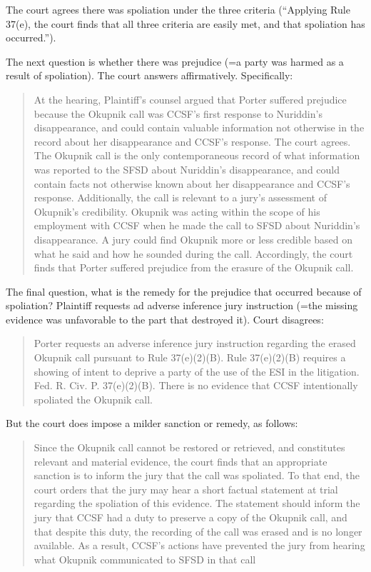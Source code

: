 \documentclass[
  10pt,
  dvipsnames,enabledeprecatedfontcommands]{scrartcl}
\begin{document}
The court agrees there was spoliation under the three criteria
(``Applying Rule 37(e), the court finds that all three criteria are
easily met, and that spoliation has occurred.'').

The next question is whether there was prejudice (=a party was harmed as
a result of spoliation). The court answers affirmatively. Specifically:

\begin{quote}
At the hearing, Plaintiff’s counsel argued that Porter suffered prejudice because the
Okupnik call was CCSF’s first response to Nuriddin’s disappearance, and could contain valuable
information not otherwise in the record about her disappearance and CCSF’s response. The court
agrees. The Okupnik call is the only contemporaneous record of what information was reported to
the SFSD about Nuriddin’s disappearance, and could contain facts not otherwise known about her
disappearance and CCSF’s response. Additionally, the call is relevant to a jury’s assessment of
Okupnik’s credibility. Okupnik was acting within the scope of his employment with CCSF when
he made the call to SFSD about Nuriddin’s disappearance. A jury could find Okupnik more or
less credible based on what he said and how he sounded during the call. Accordingly, the court
finds that Porter suffered prejudice from the erasure of the Okupnik call.
\end{quote}

The final question, what is the remedy for the prejudice that occurred
because of spoliation? Plaintiff requests ad adverse inference jury
instruction (=the missing evidence was unfavorable to the part that
destroyed it). Court disagrees:

\begin{quote}
Porter requests an adverse inference jury instruction regarding the erased Okupnik call
pursuant to Rule 37(e)(2)(B). Rule 37(e)(2)(B) requires a showing of intent to deprive a party of
the use of the ESI in the litigation. Fed. R. Civ. P. 37(e)(2)(B). There is no evidence that CCSF
intentionally spoliated the Okupnik call.
\end{quote}

But the court does impose a milder sanction or remedy, as follows:

\begin{quote}
Since the Okupnik call cannot be restored or retrieved, and constitutes
relevant and material evidence, the court finds that an appropriate sanction is to inform the jury
that the call was spoliated. To that end, the court orders that the jury may hear a short factual
statement at trial regarding the spoliation of this evidence. The statement should inform the jury
that CCSF had a duty to preserve a copy of the Okupnik call, and that despite this duty, the
recording of the call was erased and is no longer available. As a result, CCSF’s actions have
prevented the jury from hearing what Okupnik communicated to SFSD in that call
\end{quote}
\end{document}
